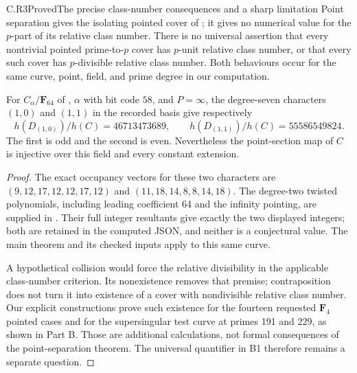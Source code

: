 \begin{claim}{C.R3}{Proved}{The precise class-number consequences and a sharp limitation}
Point separation gives the isolating pointed cover of
; it gives no numerical value for the
$p$-part of its relative class number. There is no universal
assertion that every nontrivial pointed prime-to-$p$ cover has
$p$-unit relative class number, or that every such cover has
$p$-divisible relative class number. Both behaviours occur for
the same curve, point, field, and prime degree in our computation.

For $C_\alpha/\mathbf F_{64}$ of ,
$\alpha$ with bit code $58$, and $P=\infty$, the degree-seven
characters $(1,0)$ and $(1,1)$ in the recorded basis give
respectively
\[
 h(D_{(1,0)})/h(C)=46713473689,\qquad
 h(D_{(1,1)})/h(C)=55586549824.
\]
The first is odd and the second is even. Nevertheless the
point-section map of $C$ is injective over this field and every
constant extension.
\end{claim}
\begin{proof}
The exact occupancy vectors for these two characters are
$(9,12,17,12,12,17,12)$ and $(11,18,14,8,8,14,18)$.
The degree-two twisted polynomials, including leading coefficient
64 and the infinity pointing, are supplied in
. Their full integer resultants give exactly
the two displayed integers; both are retained in the computed
JSON, and neither is a conjectural value. The main theorem and
its checked inputs apply to this same curve.

A hypothetical collision would force the relative divisibility
in the applicable class-number criterion. Its nonexistence
removes that premise; contraposition does not turn it into
existence of a cover with nondivisible relative class number.
Our explicit constructions prove such existence for the
fourteen requested $\mathbf F_4$ pointed cases and for the
supersingular test curve at primes 191 and 229, as shown in
Part B. Those are additional calculations, not formal
consequences of the point-separation theorem. The universal
quantifier in B1 therefore remains a separate question.
\end{proof}

